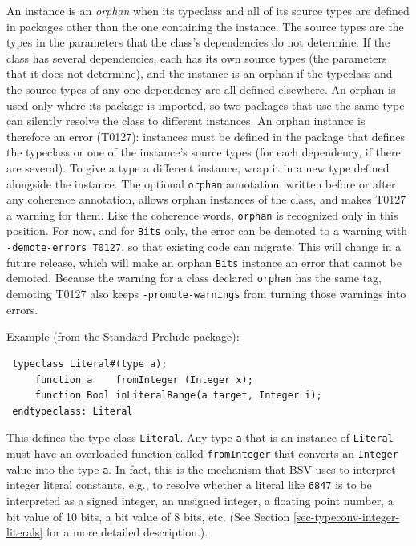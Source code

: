 \documentclass[twoside,letterpaper]{article}
\newcommand{\BSV}{BSV}
\newcommand{\te}[1]{\texttt{#1}}
\begin{document}
\index{orphan@\te{orphan} (typeclass annotation)}
An instance is an \emph{orphan} when its typeclass and all of its
source types are defined in packages other than the one containing the
instance.  The source types are the types in the parameters that the
class's dependencies do not determine.  If the class has several
dependencies, each has its own source types (the parameters that it
does not determine), and the instance is an orphan if the typeclass
and the source types of any one dependency are all defined elsewhere.
An orphan is used only where its package is imported, so two packages
that use the same type can silently resolve the class to different
instances.  An orphan instance is therefore an error (T0127):
instances must be defined in the package that defines the typeclass or
one of the instance's source types (for each dependency, if there are
several).  To give a type a different
instance, wrap it in a new type defined alongside the instance.  The
optional \texttt{orphan} annotation, written before or after any
coherence annotation, allows orphan instances of the class, and makes
T0127 a warning for them.  Like the coherence words, \texttt{orphan}
is recognized only in this position.  For now, and for \te{Bits}
only, the error can be demoted to a warning with
\texttt{-demote-errors T0127}, so that existing code can migrate.
This will change in a future release, which will make an orphan
\te{Bits} instance an error that cannot be demoted.  Because the
warning for a class declared \texttt{orphan} has the same tag,
demoting T0127 also keeps \texttt{-promote-warnings} from turning
those warnings into errors.

Example (from the Standard Prelude package):
\begin{verbatim}
 typeclass Literal#(type a);
     function a    fromInteger (Integer x);
     function Bool inLiteralRange(a target, Integer i);
 endtypeclass: Literal
\end{verbatim}
This defines the type class \texttt{Literal}.  Any type \texttt{a} that is
an instance of \texttt{Literal} must have an overloaded function called
\texttt{fromInteger} that converts an \texttt{Integer} value into the type
\texttt{a}.  In fact, this is the mechanism that {\BSV} uses to interpret
integer literal constants, e.g., to resolve whether a literal like
\texttt{6847} is to be interpreted as a signed integer, an unsigned
integer, a floating point number, a bit value of 10 bits, a bit value
of 8 bits, etc.  (See Section \ref{sec-typeconv-integer-literals} for
a more detailed description.). 
\end{document}
